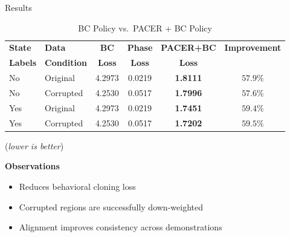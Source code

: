 \documentclass{beamer}
\begin{document}
\begin{frame}{Results}

    \begin{center}
        \begin{table}[htb]
            \caption{BC Policy vs.\ PACER + BC Policy}\label{tab:bc_vs_pacer}
            \centering
            \footnotesize
            \setlength{\tabcolsep}{4pt}
            \begin{tabular}{llcccc}
                \hline
                \textbf{State} & \textbf{Data} & \textbf{BC} & \textbf{Phase} & \textbf{PACER+BC} & \textbf{Improvement} \\
                \textbf{Labels} & \textbf{Condition} & \textbf{Loss} & \textbf{Loss} & \textbf{Loss} & \\
                \hline
                No  & Original  & 4.2973 & 0.0219 & \textbf{1.8111} & $57.9\%$ \\
                No  & Corrupted & 4.2530 & 0.0517 & \textbf{1.7996} & $57.6\%$ \\
                Yes & Original  & 4.2973 & 0.0219 & \textbf{1.7451} & $59.4\%$ \\
                Yes & Corrupted & 4.2530 & 0.0517 & \textbf{1.7202} & $59.5\%$ \\
                \hline
            \end{tabular}
        \end{table}
        \scriptsize{(\textit{lower is better})}
    \end{center}

    \vspace{1em}

    \textbf{Observations}
    \begin{itemize}
        \item Reduces behavioral cloning loss
        \item Corrupted regions are successfully down-weighted
        \item Alignment improves consistency across demonstrations
    \end{itemize}

\end{frame}
\end{document}
